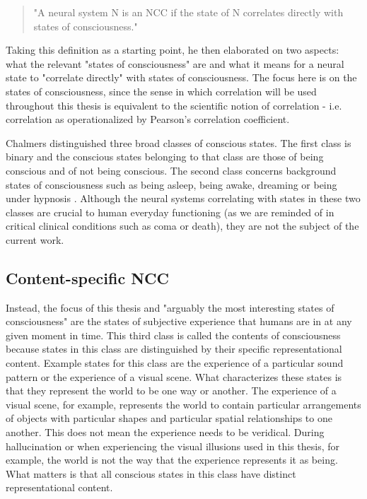 \begin{quotation}
"A neural system N is an NCC if the state of N correlates directly with states of consciousness." \parencite[p. 3]{Chalmers2000}
\end{quotation}

Taking this definition as a starting point, he then elaborated on two aspects: what the relevant "states of consciousness" are and what it means for a neural state to "correlate directly" with states of consciousness. The focus here is on the states of consciousness, since the sense in which correlation will be used throughout this thesis is equivalent to the scientific notion of correlation - i.e. correlation as operationalized by Pearson's correlation coefficient.

Chalmers \parencite*{Chalmers2000} distinguished three broad classes of conscious states. The first class is binary and the conscious states belonging to that class are those of being conscious and of not being conscious. The second class concerns background states of consciousness such as being asleep, being awake, dreaming or being under hypnosis \parencite{Chalmers2000}. Although the neural systems correlating with states in these two classes are crucial to human everyday functioning (as we are reminded of in critical clinical conditions such as coma or death), they are not the subject of the current work.

\subsection{Content-specific NCC}
Instead, the focus of this thesis and "arguably the most interesting states of consciousness" \parencite[p. 4]{Chalmers2000} are the states of subjective experience that humans are in at any given moment in time. This third class is called the contents of consciousness because states in this class are distinguished by their specific representational content. Example states for this class are the experience of a particular sound pattern or the experience of a visual scene. What characterizes these states is that they represent the world to be one way or another. The experience of a visual scene, for example, represents the world to contain particular arrangements of objects with particular shapes and particular spatial relationships to one another. This does not mean the experience needs to be veridical. During hallucination or when experiencing the visual illusions used in this thesis, for example, the world is not the way that the experience represents it as being. What matters is that all conscious states in this class have distinct representational content.

